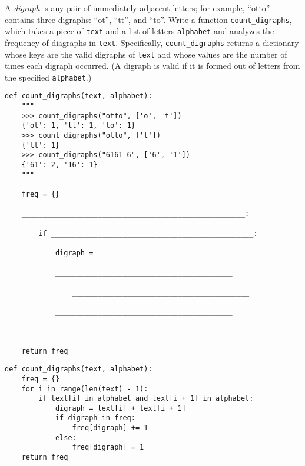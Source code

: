 \begin{blocksection}
\question A \textit{digraph} is any pair of immediately adjacent letters; for example, ``otto'' contains three digraphs: ``ot'', ``tt'', and ``to''. Write a function \lstinline{count_digraphs}, which takes a piece of \lstinline{text} and a list of letters \lstinline{alphabet} and analyzes the frequency of diagraphs in \lstinline{text}. Specifically, \lstinline{count_digraphs} returns a dictionary whose keys are the valid digraphs of \lstinline{text} and whose values are the number of times each digraph occurred. (A digraph is valid if it is formed out of letters from the specified \lstinline{alphabet}.)

\begin{lstlisting}
def count_digraphs(text, alphabet):
    """
    >>> count_digraphs("otto", ['o', 't'])
    {'ot': 1, 'tt': 1, 'to': 1}
    >>> count_digraphs("otto", ['t'])
    {'tt': 1}
    >>> count_digraphs("6161 6", ['6', '1'])
    {'61': 2, '16': 1}
    """

    freq = {}

    _____________________________________________________:

        if ________________________________________________:

            digraph = __________________________________

            __________________________________________

                __________________________________________

            __________________________________________

                __________________________________________

    return freq
\end{lstlisting}
\end{blocksection}
\begin{solution}
\begin{lstlisting}
def count_digraphs(text, alphabet):
    freq = {}
    for i in range(len(text) - 1):
        if text[i] in alphabet and text[i + 1] in alphabet:
            digraph = text[i] + text[i + 1]
            if digraph in freq:
                freq[digraph] += 1
            else: 
                freq[digraph] = 1
    return freq
\end{lstlisting}
\end{solution}

